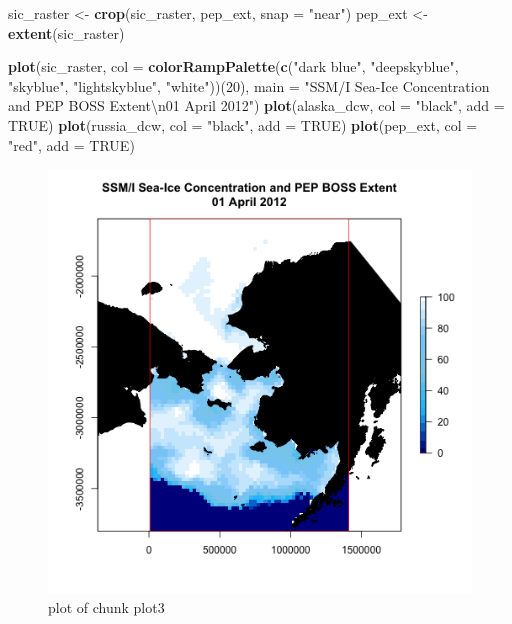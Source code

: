 \documentclass[]{article}
\makeatletter
\newenvironment{Shaded}{}{}
\newcommand{\KeywordTok}[1]{\textcolor[rgb]{0.00,0.44,0.13}{\textbf{{#1}}}}
\newcommand{\DataTypeTok}[1]{\textcolor[rgb]{0.56,0.13,0.00}{{#1}}}
\newcommand{\DecValTok}[1]{\textcolor[rgb]{0.25,0.63,0.44}{{#1}}}
\newcommand{\CharTok}[1]{\textcolor[rgb]{0.25,0.44,0.63}{{#1}}}
\newcommand{\StringTok}[1]{\textcolor[rgb]{0.25,0.44,0.63}{{#1}}}
\newcommand{\OtherTok}[1]{\textcolor[rgb]{0.00,0.44,0.13}{{#1}}}
\newcommand{\NormalTok}[1]{{#1}}
\def\maxwidth{\ifdim\Gin@nat@width>\linewidth\linewidth
\else\Gin@nat@width\fi}
\let\Oldincludegraphics\includegraphics
\renewcommand{\includegraphics}[1]{\Oldincludegraphics[width=\maxwidth]{#1}}
\makeatother
\begin{document}
\begin{Shaded}
\begin{Highlighting}[]
\NormalTok{sic_raster <- }\KeywordTok{crop}\NormalTok{(sic_raster, pep_ext, }\DataTypeTok{snap =} \StringTok{"near"}\NormalTok{)}
\NormalTok{pep_ext <- }\KeywordTok{extent}\NormalTok{(sic_raster)}
\end{Highlighting}
\end{Shaded}
\begin{Shaded}
\begin{Highlighting}[]
\KeywordTok{plot}\NormalTok{(sic_raster, }\DataTypeTok{col =} \KeywordTok{colorRampPalette}\NormalTok{(}\KeywordTok{c}\NormalTok{(}\StringTok{"dark blue"}\NormalTok{, }\StringTok{"deepskyblue"}\NormalTok{, }
    \StringTok{"skyblue"}\NormalTok{, }\StringTok{"lightskyblue"}\NormalTok{, }\StringTok{"white"}\NormalTok{))(}\DecValTok{20}\NormalTok{), }\DataTypeTok{main =} \StringTok{"SSM/I Sea-Ice Concentration and PEP BOSS Extent}\CharTok{\textbackslash{}n}\StringTok{01 April 2012"}\NormalTok{)}
\KeywordTok{plot}\NormalTok{(alaska_dcw, }\DataTypeTok{col =} \StringTok{"black"}\NormalTok{, }\DataTypeTok{add =} \OtherTok{TRUE}\NormalTok{)}
\KeywordTok{plot}\NormalTok{(russia_dcw, }\DataTypeTok{col =} \StringTok{"black"}\NormalTok{, }\DataTypeTok{add =} \OtherTok{TRUE}\NormalTok{)}
\KeywordTok{plot}\NormalTok{(pep_ext, }\DataTypeTok{col =} \StringTok{"red"}\NormalTok{, }\DataTypeTok{add =} \OtherTok{TRUE}\NormalTok{)}
\end{Highlighting}
\end{Shaded}
\begin{figure}[htbp]
\centering
\includegraphics{figure/plot3.png}
\caption{plot of chunk plot3}
\end{figure}
\end{document}

